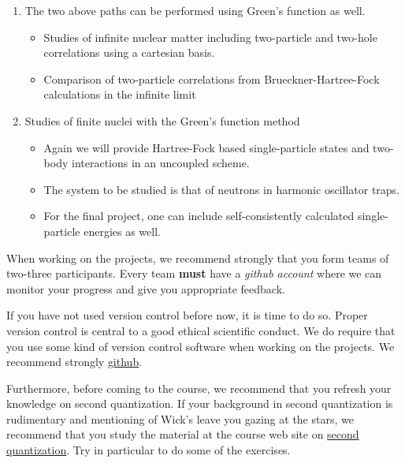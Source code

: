 \documentclass[%
twoside,                 %
final,                   %
10pt]{article}
\begin{document}
\begin{enumerate}
\begin{itemize}
\end{itemize}

\noindent
\item The two above paths can be performed using Green's function as well.
\begin{itemize}

  \item Studies of infinite nuclear matter including two-particle and two-hole correlations using a cartesian basis.

  \item Comparison of two-particle correlations from Brueckner-Hartree-Fock calculations in the infinite limit

\end{itemize}

\noindent
\item Studies of finite nuclei with the Green's function method
\begin{itemize}

  \item Again we will provide Hartree-Fock based single-particle states and two-body interactions in an uncoupled scheme.

  \item The system to be studied is that of neutrons in harmonic oscillator traps. 

  \item For the final project, one can include self-consistently calculated single-particle energies as well.
\end{itemize}

\noindent
\end{enumerate}

\noindent
When working on the projects, we recommend strongly that you form teams of two-three participants. Every team
\textbf{must} have a \emph{github account} where we can monitor your progress and give you appropriate feedback.

If you have not used version control before now, it is time to do so. 
Proper version control is central to a good ethical scientific conduct. 
We do require that you use some kind of version control software when working on the projects. We recommend strongly \href{{https://github.com/}}{github}. 

Furthermore, before coming to the course, we recommend that you refresh your knowledge on second quantization.
If your background in second quantization is rudimentary and mentioning of Wick's leave you gazing at the stars,
we recommend that you study the material at the course web site on \href{{http://nucleartalent.github.io/Course2ManyBodyMethods/doc/pub/secondquant/html/secondquant-bs.html}}{second quantization}. Try in particular to do some of the exercises.
\end{document}

